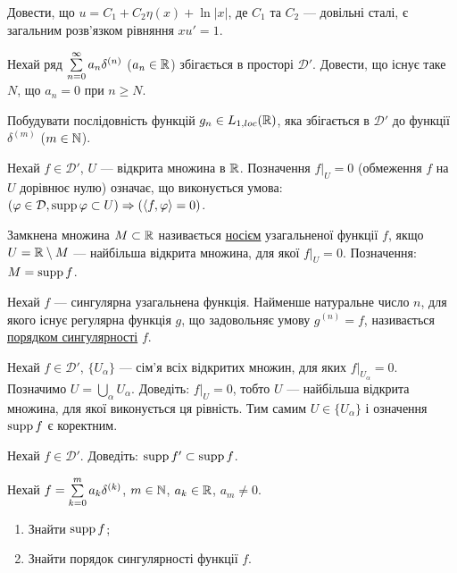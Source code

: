 \begin{exercise}
    Довести, що $u = C_1 + C_2 \eta(x) + \ln|x|$, де $C_1$ та $C_2$ --- довільні сталі,
    є загальним розв'язком рівняння $x u' = 1$.
\end{exercise}
\begin{exercise}
    Нехай ряд $\sum\limits_{n=0}^{\infty} a_n \delta^{(n)}$ ($a_n \in \mathbb{R}$) збігається в просторі $\mathcal{D}'$.
    Довести, що існує таке $N$, що $a_n = 0$ при $n \geq N$.
\end{exercise}
\begin{exercise}
    Побудувати послідовність функцій $g_n \in L_{1, loc}(\mathbb{R})$,
    яка збігається в $\mathcal{D}'$ до функції $\delta^{(m)}$ ($m \in \mathbb{N}$).
\end{exercise}
\begin{theory}
    Нехай $f \in \mathcal{D}'$, $U$ --- відкрита множина в $\mathbb{R}$. Позначення
    $f |_{U} = 0$ (обмеження $f$ на $U$ дорівнює нулю) означає, що
    виконується умова: $(\varphi \in \mathcal{D}, \operatorname{supp} \varphi \subset U) \Rightarrow (\left\langle f, \varphi\right\rangle = 0)$.
    
    \noindent Замкнена множина $M \subset \mathbb{R}$ називається \ul{носієм} узагальненої
    функції $f$, якщо $U = \mathbb{R} \setminus M$ --- найбільша відкрита множина, для якої $f |_{U} = 0$.
    Позначення: $M = \operatorname{supp} f$.

    \noindent Нехай $f$ --- сингулярна узагальнена функція. Найменше натуральне число $n$, для якого існує регулярна функція $g$, що задовольняє умову 
    $g^{(n)} = f$, називається \ul{порядком сингулярності} $f$.
\end{theory}
\begin{exercise*}
    Нехай $f \in \mathcal{D}'$, $\{ U_\alpha\}$ --- сім'я всіх відкритих множин, для яких $f |_{U_\alpha} = 0$.
    Позначимо $U = \bigcup\limits_{\alpha} U_\alpha$. Доведіть: $f |_{U} = 0$, тобто $U$ --- найбільша
    відкрита множина, для якої виконується ця рівність. Тим самим $U \in \{ U_\alpha\}$ і означення $\operatorname{supp} f$ 
    є коректним.
\end{exercise*}
\begin{exercise}
    Нехай $f \in \mathcal{D}'$. Доведіть: $\operatorname{supp} f' \subset \operatorname{supp} f$.
\end{exercise}
\begin{exercise}
    Нехай $f = \sum\limits_{k=0}^{m} a_k \delta^{(k)}$, $m \in \mathbb{N}$, $a_k \in \mathbb{R}$, $a_m \neq 0$.
    \begin{enumerate}
        \item Знайти $\operatorname{supp} f$;
        \item Знайти порядок сингулярності функції $f$.
    \end{enumerate}
\end{exercise}
